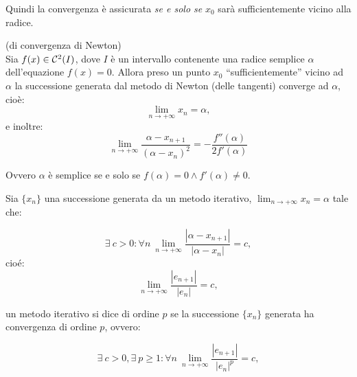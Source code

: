 Quindi la convergenza è assicurata \emph{se e solo se} $x_0$ sarà 
sufficientemente vicino alla radice.

\begin{teo}(di convergenza di Newton)\\
Sia $f(x) \in \mathcal{C}^2(I)$, dove $I$ è un intervallo contenente una radice
semplice $\alpha$ dell'equazione $f(x) = 0$. Allora preso un punto $x_0$
``sufficientemente''  vicino ad $\alpha$ la successione generata dal metodo
di Newton (delle tangenti) converge ad $\alpha$, cioè:
\[
\lim_{n \to +\infty}x_n = \alpha,
\]
e inoltre:
\[
\lim_{n \to +\infty}\frac{\alpha - x_{n+1}}{(\alpha - x_n)^2} = 
- \frac{f''(\alpha)}{2f'(\alpha)}
\]
\end{teo}
Ovvero $\alpha$ è semplice se e solo se  $f(\alpha)=0 \wedge f'(\alpha) \neq 
0$.

\begin{defi}
Sia $\{x_n\}$ una successione generata da un metodo iterativo, 
$\lim_{n \to +\infty}x_n = \alpha$ tale che:

\[
\exists\ c > 0 \colon \forall n \ 
\lim_{n \to +\infty}\frac{|\alpha -x_{n+1}|}{|\alpha -x_n|} = c,
\]
cioé:
\[
\lim_{n \to +\infty}\frac{|e_{n+1}|}{|e_n|} = c,
\]

un metodo iterativo si dice di ordine $p$ se la successione $\{x_n\}$
generata ha convergenza di ordine $p$, ovvero:

\[
\exists\ c > 0, \exists\ p \geq 1 \colon \forall n \ 
\lim_{n \to +\infty}\frac{|e_{n+1}|}{|e_n|^p} = c,
\]
\end{defi}

